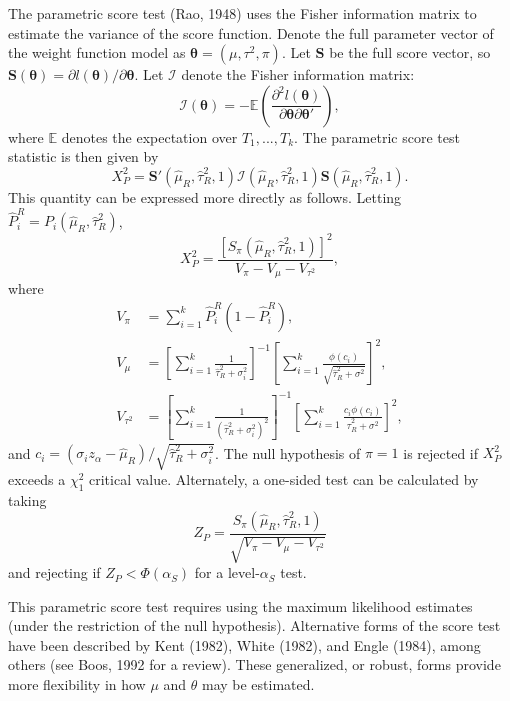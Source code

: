 \documentclass[man,floatsintext]{apa6}
\begin{document}
The parametric score test (Rao, 1948) uses the Fisher information matrix to estimate the variance of the score function. Denote the full parameter vector of the weight function model as \(\boldsymbol\theta = (\mu, \tau^2, \pi)\). Let \(\bm{S}\) be the full score vector, so \(\bm{S}(\boldsymbol\theta) = \partial l(\boldsymbol\theta) / \partial \boldsymbol\theta\). Let \(\mathcal{I}\) denote the Fisher information matrix:
\[
\mathcal{I}(\boldsymbol\theta) = - \mathbb{E}\left(\frac{\partial^2 l(\boldsymbol\theta)}{\partial \boldsymbol\theta \partial \boldsymbol\theta'} \right),
\]
where \(\mathbb{E}\) denotes the expectation over \(T_1,...,T_k\). The parametric score test statistic is then given by
\[
X^2_P = \bm{S}'(\hat\mu_R, \hat\tau^2_R, 1) \mathcal{I}(\hat\mu_R, \hat\tau^2_R, 1) \bm{S}(\hat\mu_R, \hat\tau^2_R, 1).
\]
This quantity can be expressed more directly as follows. Letting \(\hat{P}_i^R = P_i(\hat\mu_R, \hat\tau^2_R)\),
\begin{equation}
X^2_P = \frac{\left[S_\pi(\hat\mu_R, \hat\tau^2_R, 1)\right]^2}{V_\pi - V_\mu - V_{\tau^2}},
\label{eq:parametric-score}
\end{equation}
where
\[
\begin{aligned}
V_\pi &= \sum_{i=1}^k \hat{P}^R_i \left(1 - \hat{P}^R_i\right), \\
V_\mu &= \left[\sum_{i=1}^k \frac{1}{\hat\tau_R^2 + \sigma_i^2}\right]^{-1}\left[\sum_{i=1}^k \frac{\phi(c_i)}{\sqrt{\hat\tau^2_R + \sigma^2}}\right]^2, \\
V_{\tau^2} &= \left[\sum_{i=1}^k \frac{1}{\left(\hat\tau_R^2 + \sigma_i^2\right)^2}\right]^{-1}\left[\sum_{i=1}^k \frac{c_i\phi(c_i)}{\hat\tau^2_R + \sigma^2}\right]^2,
\end{aligned}
\]
and \(c_i = \left(\sigma_i z_\alpha - \hat\mu_R\right) / \sqrt{\hat\tau^2_R + \sigma_i^2}\).
The null hypothesis of \(\pi = 1\) is rejected if \(X^2_P\) exceeds a \(\chi^2_1\) critical value.
Alternately, a one-sided test can be calculated by taking
\begin{equation}
Z_P = \frac{S_\pi(\hat\mu_R, \hat\tau^2_R, 1)}{\sqrt{V_\pi - V_\mu - V_{\tau^2}}}
\end{equation}
and rejecting if \(Z_P < \Phi(\alpha_S)\) for a level-\(\alpha_S\) test.

This parametric score test requires using the maximum likelihood estimates (under the restriction of the null hypothesis). Alternative forms of the score test have been described by Kent (1982), White (1982), and Engle (1984), among others (see Boos, 1992 for a review).
These generalized, or robust, forms provide more flexibility in how \(\mu\) and \(\theta\) may be estimated.
\end{document}
